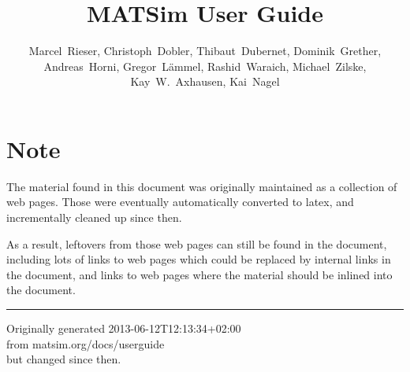 \documentclass[a4paper,11pt]{report}
\newcommand{\NextFile}[1]{}
\def\umbruch{\vfill\eject}
\def\umbruch{\relax}
\begin{document}
\NextFile{index.html}

\title{MATSim User Guide}

\author{%
Marcel~Rieser, %
%
Christoph~Dobler,
Thibaut~Dubernet,
Dominik~Grether,
Andreas~Horni, 
Gregor~Lämmel,
Rashid~Waraich,
Michael~Zilske,
%
Kay~W.~Axhausen, %
Kai~Nagel %
}



\umbruch

\section*{Note}

The material found in this document was originally maintained as a collection of web pages.  Those were eventually automatically converted to latex, and incrementally cleaned up since then.  

As a result, leftovers from those web pages can still be found in the document, including lots of links to web pages which could be replaced by internal links in the document, and links to web pages where the material should be inlined into the document.
\\
\hrule

Originally generated 2013-06-12T12:13:34+02:00
\\from matsim.org/docs/userguide
\\but changed since then.



\umbruch

\tableofcontents













%






\umbruch
\end{document}
